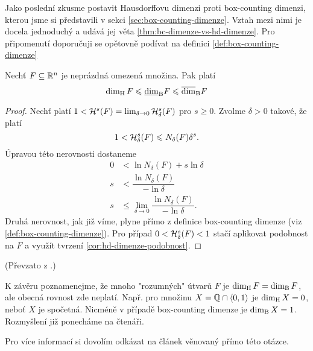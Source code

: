 Jako poslední zkusme postavit Hausdorffovu dimenzi proti box-counting dimenzi, kterou jsme si představili v sekci \ref{sec:box-counting-dimenze}. Vztah mezi nimi je docela jednoduchý a udává jej věta \ref{thm:bc-dimenze-vs-hd-dimenze}. Pro připomenutí doporučuji se opětovně podívat na definici \ref{def:box-counting-dimenze}
\begin{theorem}\label{thm:bc-dimenze-vs-hd-dimenze}
    Nechť $F\subseteq\mathbb{R}^n$ je neprázdná omezená množina. Pak platí
    \[\operatorname{dim_H}{F}\leqslant\underline{\dim}_\textup{B}{F}\leqslant\overline{\dim}_\textup{B}{F}\]
\end{theorem}
\begin{proof}
    Nechť platí $1<\mathcal{H}^{s}(F)=\lim_{\delta\to 0}\mathcal{H}_{\delta}^{s}(F)$ pro $s\geqslant 0$. Zvolme $\delta>0$ takové, že platí
    \[1<\mathcal{H}_{\delta}^{s}(F)\leqslant N_\delta(F)\delta^s.\]
    Úpravou této nerovnosti dostaneme
    \begin{align*}
        0&<\ln{N_\delta(F)}+s\ln{\delta}\\
        s&<\dfrac{\ln{N_\delta(F)}}{-\ln{\delta}}\\
        s&\leqslant\lim_{\delta\to 0}\dfrac{\ln{N_\delta(F)}}{-\ln{\delta}}.
    \end{align*}
    Druhá nerovnost, jak již víme, plyne přímo z definice box-counting dimenze (viz \ref{def:box-counting-dimenze}). Pro případ $0<\mathcal{H}_{\delta}^{s}(F)<1$ stačí aplikovat podobnost na $F$ a využít tvrzení \ref{cor:hd-dimenze-podobnost}.
\end{proof}
(Převzato z \citep[str. 50]{Falconer2014}.)

K závěru poznamenejme, že mnoho "rozumných" útvarů $F$ je $\operatorname{dim_H}{F}=\operatorname{dim_B}{F}$, ale obecná rovnost zde neplatí. Např. pro množinu $X=\mathbb{Q}\cap\langle0,1\rangle$ je $\operatorname{dim_H}{X}=0$, neboť $X$ je spočetná. Nicméně v případě box-counting dimenze je $\operatorname{dim_B}{X}=1$. Rozmyšlení již ponecháme na čtenáři.

Pro více informací si dovolím odkázat na článek \cite{Falconer1989} věnovaný přímo této otázce.